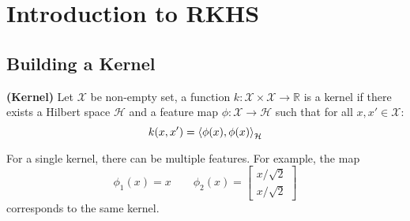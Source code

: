 \section{Introduction to RKHS}

\subsection{Building a Kernel}

\begin{definition}{\textbf{(Kernel)}}
    Let $ \mathcal{X} $ be non-empty set, a function $k: \mathcal{X} \times \mathcal{X} \rightarrow \mathbb{R} $ is a kernel if there exists a Hilbert space $\mathcal{H}$ and a feature map $\phi:\mathcal{X}\rightarrow\mathcal{H}$ such that for all $x, x'\in\mathcal{X}$:
    \begin{equation*}
        k(x, x') = \left\langle \phi(x), \phi(x) \right\rangle_\mathcal{H}
    \end{equation*}
\end{definition}

\begin{remark}
    For a single kernel, there can be multiple features. For example, the map 
    \begin{equation*}
        \phi_1(x) = x \qquad \phi_2(x) = \begin{bmatrix}
            x/\sqrt{2} \\ x/\sqrt{2}
        \end{bmatrix}
    \end{equation*}
    corresponds to the same kernel.
\end{remark}

